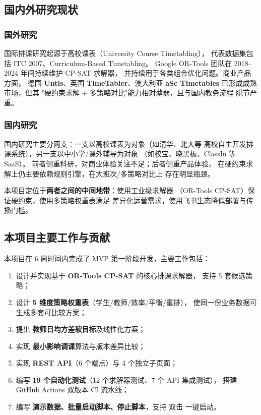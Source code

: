 \subsection{国内外研究现状}

\subsubsection{国外研究}

国际排课研究起源于高校课表（University Course Timetabling），
代表数据集包括 ITC 2007、Curriculum-Based Timetabling。
Google OR-Tools 团队在 2018--2024 年间持续维护 CP-SAT 求解器，
并持续用于各类组合优化问题。商业产品方面，
德国 \textbf{Untis}、英国 \textbf{TimeTabler}、澳大利亚
\textbf{aSc Timetables} 已形成成熟市场，但其
"硬约束求解 + 多策略对比"能力相对薄弱，且与国内教务流程
脱节严重。

\subsubsection{国内研究}

国内研究主要分两支：一支以高校课表为对象（如清华、北大等
高校自主开发排课系统），另一支以中小学/课外辅导为对象
（如校宝、晓黑板、ClassIn 等 SaaS）。
前者侧重科研，对商业体验关注不足；后者侧重产品体验，
在硬约束求解上仍主要依赖规则引擎，在大班次/多策略对比上
存在明显瓶颈。

本项目定位于\textbf{两者之间的中间地带}：使用工业级求解器
（OR-Tools CP-SAT）保证硬约束，使用多策略权重表满足
差异化运营需求，使用飞书生态降低部署与传播门槛。

\subsection{本项目主要工作与贡献}

本项目在 6 周时间内完成了 MVP 第一阶段开发，主要工作包括：
\begin{enumerate}[leftmargin=2em,itemsep=0.2em]
\item 设计并实现基于 \textbf{OR-Tools CP-SAT} 的核心排课求解器，
支持 5 套候选策略；
\item 设计 \textbf{5 维度策略权重表}（学生/教师/效率/平衡/重排），
使同一份业务数据可生成多套可比较方案；
\item 提出 \textbf{教师日均方差软目标}及线性化方案；
\item 实现 \textbf{最小影响调课}算法与版本差异比较；
\item 实现 \textbf{REST API}（6 个端点）与 4 个独立子页面；
\item 编写 \textbf{19 个自动化测试}（12 个求解器测试、7 个 API 集成测试），
搭建 GitHub Actions 双版本 CI 流水线；
\item 编写 \textbf{演示数据、批量启动脚本、停止脚本}，支持
双击  一键启动。
\end{enumerate}

